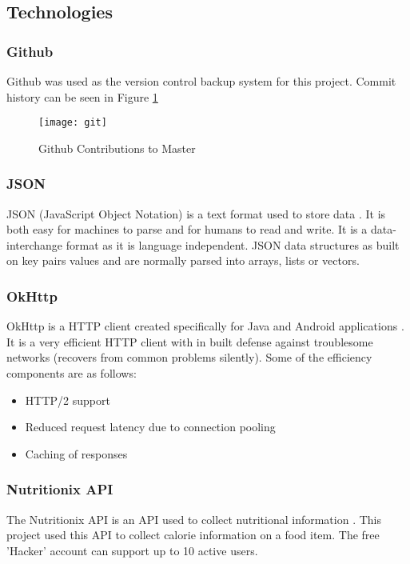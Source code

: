 \subsection*{Technologies}

\subsubsection*{Github}
Github was used as the version control backup system for this project.
Commit history can be seen in Figure \ref{fig:git}

\begin{figure}[h]
    \texttt{[image: git]}
    \caption{Github Contributions to Master}
    \label{fig:git}
\end{figure}

\subsubsection*{JSON}
JSON (JavaScript Object Notation) is a text format used to store data \parencite{json}.
It is both easy for machines to parse and for humans to read and write.
It is a data-interchange format as it is language independent.
JSON data structures as built on key pairs values and are normally parsed into arrays, lists or vectors.

\subsubsection*{OkHttp}
OkHttp is a HTTP client created specifically for Java and Android applications \parencite{okhttp}.
It is a very efficient HTTP client with in built defense against troublesome networks (recovers from common problems silently).
Some of the efficiency components are as follows:
\begin{itemize}
    \item{HTTP/2 support}
    \item{Reduced request latency due to connection pooling}
    \item{Caching of responses}
\end{itemize}

\subsubsection*{Nutritionix API}
The Nutritionix API is an API used to collect nutritional information \parencite{nutritionix}.
This project used this API to collect calorie information on a food item.
The free 'Hacker' account can support up to 10 active users.




